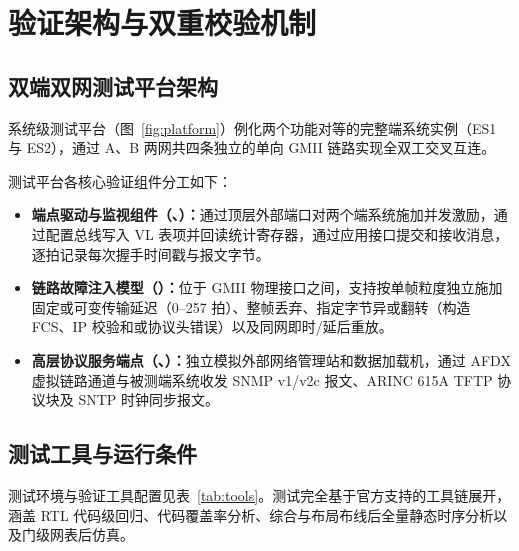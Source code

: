\chapter{验证架构与双重校验机制}\label{ch:env}

\section{双端双网测试平台架构}

系统级测试平台（图~\ref{fig:platform}）例化两个功能对等的完整端系统实例（ES1 与 ES2），通过 A、B 两网共四条独立的单向 GMII 链路实现全双工交叉互连。


测试平台各核心验证组件分工如下：
\begin{itemize}
  \item \textbf{端点驱动与监视组件（、）：}通过顶层外部端口对两个端系统施加并发激励，通过配置总线写入 VL 表项并回读统计寄存器，通过应用接口提交和接收消息，逐拍记录每次握手时间戳与报文字节。
  \item \textbf{链路故障注入模型（）：}位于 GMII 物理接口之间，支持按单帧粒度独立施加固定或可变传输延迟（0--257 拍）、整帧丢弃、指定字节异或翻转（构造 FCS、IP 校验和或协议头错误）以及同网即时/延后重放。
  \item \textbf{高层协议服务端点（、）：}独立模拟外部网络管理站和数据加载机，通过 AFDX 虚拟链路通道与被测端系统收发 SNMP v1/v2c 报文、ARINC 615A TFTP 协议块及 SNTP 时钟同步报文。
\end{itemize}

\section{测试工具与运行条件}

测试环境与验证工具配置见表~\ref{tab:tools}。测试完全基于官方支持的工具链展开，涵盖 RTL 代码级回归、代码覆盖率分析、综合与布局布线后全量静态时序分析以及门级网表后仿真。

